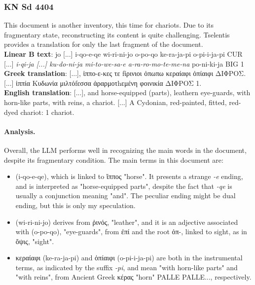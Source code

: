 \subsubsection{KN Sd 4404}
This document is another inventory, this time for chariots.
Due to its fragmentary state, reconstructing its content is quite challenging.
Tselentis provides a translation for only the last fragment of the document. \\
\textbf{Linear B text}: jo [...] i-qo-e-qe wi-ri-ni-jo o-po-qo ke-ra-ja-pi o-pi-i-ja-pi CUR [...] \textit{i-qi-ja [...] ku-do-ni-ja mi-to-we-sa-e a-ra-ro-mo-te-me-na} po-ni-ki-ja BIG 1 \\
\textbf{Greek translation}: \textgreek{[...], ἱππο-ε-κες τε fίρινιοι ὀπωπω κεραίαφι ὀπίαιφι ΔΙΦΡΟΣ. [...] ἱππία Κυδωνία μιλτόfεσσα ἀραρμοτhεμένη φοινικία ΔΙΦΡΟΣ 1.} \\
\textbf{English translation}: [...], and horse-equipped (parts), leathern eye-guards, with horn-like parts, with reins, a chariot. [...] A Cydonian, red-painted, fitted, red-dyed chariot: 1 chariot.

\paragraph{Analysis.}
Overall, the LLM performs well in recognizing the main words in the document, despite its fragmentary condition.
The main terms in this document are:
\begin{itemize}
  \item \textlinb{\Bi\Bqo\Be\Bqe} (i-qo-e-qe), which is linked to \textgreek{ἵππος} "horse". 
  It presents a strange \textit{-e} ending, and is interpreted as "horse-equipped parts", despite the fact that \textit{-qe} is usually a conjunction meaning "and".
  The peculiar ending might be dual ending, but this is only my speculation.
  \item \textlinb{\Bwi\Bri\Bni\Bo} (wi-ri-ni-jo) derives from \textgreek{ῥινός}, "leather", and it is an adjective associated with \textlinb{\Bo\Bpo\Bqo} (o-po-qo), "eye-guards", from \textgreek{ἐπί} and the root \textgreek{ὀπ-}, linked to sight, as in \textgreek{ὄψις}, "sight".
  \item \textgreek{κεραίαφι} (ke-ra-ja-pi) and \textgreek{ὀπίαιφι} (o-pi-i-ja-pi) are both in the instrumental terms, as indicated by the suffix \textit{-pi}, and mean "with horn-like parts" and "with reins", from Ancient Greek \textgreek{κέρας} "horn" PALLE PALLE..., respectively.
\end{itemize}

